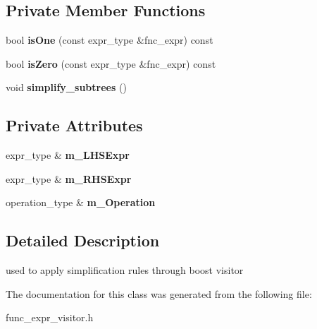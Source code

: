 \subsection*{Private Member Functions}
\begin{DoxyCompactItemize}
\item 
\hypertarget{classcSimplifyVisitor_a4c373b4b1b00b6380c486a5792842cd1}{bool {\bfseries is\-One} (const expr\-\_\-type \&fnc\-\_\-expr) const }\label{classcSimplifyVisitor_a4c373b4b1b00b6380c486a5792842cd1}

\item 
\hypertarget{classcSimplifyVisitor_a8c88b0d471d8f8f2e540065d2e62cc8b}{bool {\bfseries is\-Zero} (const expr\-\_\-type \&fnc\-\_\-expr) const }\label{classcSimplifyVisitor_a8c88b0d471d8f8f2e540065d2e62cc8b}

\item 
\hypertarget{classcSimplifyVisitor_a4ac83dddafe7cbc7036d92690d0986b4}{void {\bfseries simplify\-\_\-subtrees} ()}\label{classcSimplifyVisitor_a4ac83dddafe7cbc7036d92690d0986b4}

\end{DoxyCompactItemize}
\subsection*{Private Attributes}
\begin{DoxyCompactItemize}
\item 
\hypertarget{classcSimplifyVisitor_aadc62bb5504b8b08d4322ff3275ddd56}{expr\-\_\-type \& {\bfseries m\-\_\-\-L\-H\-S\-Expr}}\label{classcSimplifyVisitor_aadc62bb5504b8b08d4322ff3275ddd56}

\item 
\hypertarget{classcSimplifyVisitor_af86b398385aec55508c1ef939a1fa164}{expr\-\_\-type \& {\bfseries m\-\_\-\-R\-H\-S\-Expr}}\label{classcSimplifyVisitor_af86b398385aec55508c1ef939a1fa164}

\item 
\hypertarget{classcSimplifyVisitor_a5bf0b8e33060abaa350d06eb3fe9e30c}{operation\-\_\-type \& {\bfseries m\-\_\-\-Operation}}\label{classcSimplifyVisitor_a5bf0b8e33060abaa350d06eb3fe9e30c}

\end{DoxyCompactItemize}


\subsection{Detailed Description}
used to apply simplification rules through boost visitor 

The documentation for this class was generated from the following file\-:\begin{DoxyCompactItemize}
\item 
func\-\_\-expr\-\_\-visitor.\-h\end{DoxyCompactItemize}
